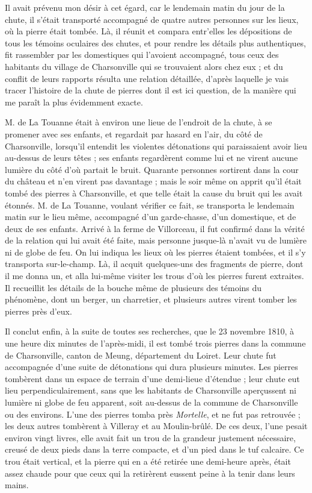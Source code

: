 \documentclass[a4paper, 12pt, oneside, french]{article}
\begin{document}
Il avait prévenu mon désir à cet égard, car le lendemain matin du jour de la chute, il s'était transporté accompagné de quatre autres personnes sur les lieux, où la pierre était tombée. Là, il réunit et compara entr'elles les dépositions de tous les témoins oculaires des chutes, et pour rendre les détails plus authentiques, fit rassembler par les domestiques qui l'avoient accompagné, tous ceux des habitants du village de Charsonville qui se trouvaient alors chez eux ; et du conflit de leurs rapports résulta une relation détaillée, d'après laquelle je vais tracer l'histoire de la chute de pierres dont il est ici question, de la manière qui me paraît la plus évidemment exacte.

M. de La Touanne était à environ une lieue de l'endroit de la chute, à se promener avec ses enfants, et regardait par hasard en l'air, du côté de Charsonville, lorsqu'il entendit les violentes détonations qui paraissaient avoir lieu au-dessus de leurs têtes ; ses enfants regardèrent comme lui et ne virent aucune lumière du côté d'où partait le bruit. Quarante personnes sortirent dans la cour du château et n'en virent pas davantage ; mais le soir même on apprit qu'il était tombé des pierres à Charsonville, et que telle était la cause du bruit qui les avait étonnés. M. de La Touanne, voulant vérifier ce fait, se transporta le lendemain matin sur le lieu même, accompagné d'un garde-chasse, d'un domestique, et de deux de ses enfants. Arrivé à la ferme de Villorceau, il fut confirmé dans la vérité de la relation qui lui avait été faite, mais personne jusque-là n'avait vu de lumière ni de globe de feu. On lui indiqua les lieux où les pierres étaient tombées, et il s'y transporta sur-le-champ. Là, il acquit quelques-uns des fragments de pierre, dont il me donna un, et alla lui-même visiter les trous d'où les pierres furent extraites. Il recueillit les détails de la bouche même de plusieurs des témoins du phénomène, dont un berger, un charretier, et plusieurs autres virent tomber les pierres près d'eux.

Il conclut enfin, à la suite de toutes ses recherches, que le 23 novembre 1810, à une heure dix minutes de l'après-midi, il est tombé trois pierres dans la commune de Charsonville, canton de Meung, département du Loiret. Leur chute fut accompagnée d'une suite de détonations qui dura plusieurs minutes. Les pierres tombèrent dans un espace de terrain d'une demi-lieue d'étendue ; leur chute eut lieu perpendiculairement, sans que les habitants de Charsonville aperçussent ni lumière ni globe de feu apparent, soit au-dessus de la commune de Charsonville ou des environs. L'une des pierres tomba près \emph{Mortelle}, et ne fut pas retrouvée ; les deux autres tombèrent à Villeray et au Moulin-brûlé. De ces deux, l'une pesait environ vingt livres, elle avait fait un trou de la grandeur justement nécessaire, creusé de deux pieds dans la terre compacte, et d'un pied dans le tuf calcaire. Ce trou était vertical, et la pierre qui en a été retirée une demi-heure après, était assez chaude pour que ceux qui la retirèrent eussent peine à la tenir dans leurs mains.
\end{document}
